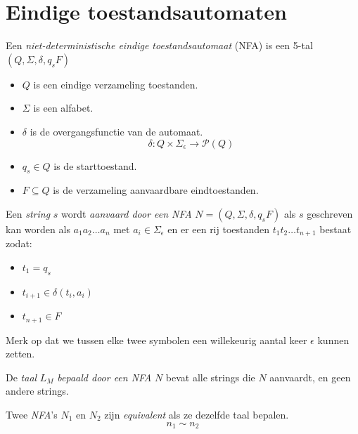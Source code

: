 \documentclass[main.tex]{subfiles}
\begin{document}
\section{Eindige toestandsautomaten}
\label{sec:eind-toest}

\begin{de}
  Een \emph{niet-deterministische eindige toestandsautomaat} (NFA) is een 5-tal $(Q,\Sigma,\delta,q_{s}F)$
  \begin{itemize}
  \item $Q$ is een eindige verzameling toestanden.
  \item $\Sigma$ is een alfabet.
  \item $\delta$ is de overgangsfunctie van de automaat.
  \[ \delta: Q \times \Sigma_{\epsilon} \rightarrow \mathcal{P}(Q) \]
  \item $q_{s} \in Q$ is de starttoestand.
  \item $F \subseteq Q$ is de verzameling aanvaardbare eindtoestanden.
  \end{itemize}
\end{de}

\begin{de}
  Een \emph{string} $s$ wordt \emph{aanvaard door een NFA} $N=(Q,\Sigma,\delta,q_{s}F)$ als $s$ geschreven kan worden als $a_{1}a_{2}\ldots a_{n}$ met $a_{i} \in \Sigma_{\epsilon}$ en er een rij toestanden $t_{1}t_{2}\ldots t_{n+1}$ bestaat zodat:
  \begin{itemize}
  \item $t_{1} = q_{s}$
  \item $t_{i+1} \in \delta(t_{i},a_{i})$
  \item $t_{n+1} \in F$
  \end{itemize}
  Merk op dat we tussen elke twee symbolen een willekeurig aantal keer $\epsilon$ kunnen zetten.
\end{de}

\begin{de}
  De \emph{taal} $L_{M}$ \emph{bepaald door een NFA} $N$ bevat alle strings die $N$ aanvaardt, en geen andere strings.
\end{de}

\begin{de}
  Twee \emph{NFA}'s $N_{1}$ en $N_{2}$ zijn \emph{equivalent} als ze dezelfde taal bepalen.
  \[ n_{1} \sim n_{2} \]
\end{de}
\end{document}

